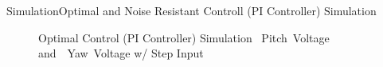 \documentclass{beamer}
\begin{document}
\begin{frame}{Simulation}{Optimal and Noise Resistant Controll (PI Controller) Simulation}
    \begin{figure}
      \centering
      \caption{Optimal Control (PI Controller) Simulation ~Pitch~Voltage and~~Yaw~Voltage w/ Step Input}
      \label{fig:LQR_PI_Sim_volt}
    \end{figure}
\end{frame}
\end{document}
